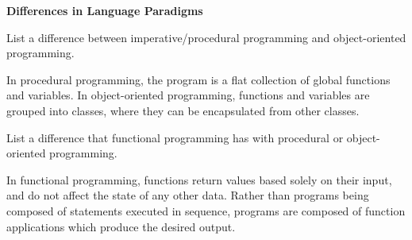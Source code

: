 \textbf{Differences in Language Paradigms}

List a difference between imperative/procedural programming and object-oriented programming.

\begin{answer}
In procedural programming, the program is a flat collection of global functions and variables. In object-oriented programming, functions and variables are grouped into classes, where they can be encapsulated from other classes.
\end{answer}


List a difference that functional programming has with procedural or object-oriented programming.

\begin{answer}
In functional programming, functions return values based solely on their input, and do not affect the state of any other data. Rather than programs being composed of statements executed in sequence, programs are composed of function applications which produce the desired output.
\end{answer}